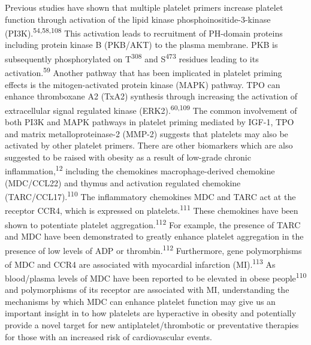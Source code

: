 \documentclass[11pt,twoside]{bristolthesis}
\begin{document}
Previous studies have shown that multiple platelet primers increase platelet function through activation of the lipid kinase phosphoinositide-3-kinase (PI3K).\textsuperscript{54,58,108} This activation leads to recruitment of PH-domain proteins including protein kinase B (PKB/AKT) to the plasma membrane. PKB is subsequently phosphorylated on T\textsuperscript{308} and S\textsuperscript{473} residues leading to its activation.\textsuperscript{59} Another pathway that has been implicated in platelet priming effects is the mitogen-activated protein kinase (MAPK) pathway. TPO can enhance thromboxane A2 (TxA2) synthesis through increasing the activation of extracellular signal regulated kinase (ERK2).\textsuperscript{60,109} The common involvement of both PI3K and MAPK pathways in platelet priming mediated by IGF-1, TPO and matrix metalloproteinase-2 (MMP-2) suggests that platelets may also be activated by other platelet primers. There are other biomarkers which are also suggested to be raised with obesity as a result of low-grade chronic inflammation,\textsuperscript{12} including the chemokines macrophage-derived chemokine (MDC/CCL22) and thymus and activation regulated chemokine (TARC/CCL17).\textsuperscript{110} The inflammatory chemokines MDC and TARC act at the receptor CCR4, which is expressed on platelets.\textsuperscript{111} These chemokines have been shown to potentiate platelet aggregation.\textsuperscript{112} For example, the presence of TARC and MDC have been demonstrated to greatly enhance platelet aggregation in the presence of low levels of ADP or thrombin.\textsuperscript{112} Furthermore, gene polymorphisms of MDC and CCR4 are associated with myocardial infarction (MI).\textsuperscript{113} As blood/plasma levels of MDC have been reported to be elevated in obese people\textsuperscript{110} and polymorphisms of its receptor are associated with MI, understanding the mechanisms by which MDC can enhance platelet function may give us an important insight in to how platelets are hyperactive in obesity and potentially provide a novel target for new antiplatelet/thrombotic or preventative therapies for those with an increased risk of cardiovascular events.
\end{document}
